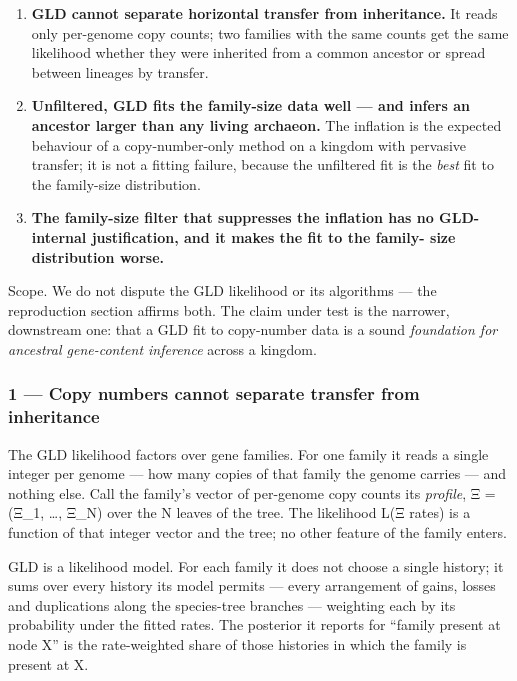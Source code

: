 \documentclass[
  10pt,
]{article}
\providecommand{\tightlist}{%
  \setlength{\itemsep}{0pt}\setlength{\parskip}{0pt}}
\begin{document}
\begin{enumerate}
\def\labelenumi{\arabic{enumi}.}
\tightlist
\item
  \textbf{GLD cannot separate horizontal transfer from inheritance.} It
  reads only per-genome copy counts; two families with the same counts
  get the same likelihood whether they were inherited from a common
  ancestor or spread between lineages by transfer.
\item
  \textbf{Unfiltered, GLD fits the family-size data well --- and infers
  an ancestor larger than any living archaeon.} The inflation is the
  expected behaviour of a copy-number-only method on a kingdom with
  pervasive transfer; it is not a fitting failure, because the
  unfiltered fit is the \emph{best} fit to the family-size distribution.
\item
  \textbf{The family-size filter that suppresses the inflation has no
  GLD-internal justification, and it makes the fit to the family- size
  distribution worse.}
\end{enumerate}

Scope. We do not dispute the GLD likelihood or its algorithms --- the
reproduction section affirms both. The claim under test is the narrower,
downstream one: that a GLD fit to copy-number data is a sound
\emph{foundation for ancestral gene-content inference} across a kingdom.

\subsubsection{1 --- Copy numbers cannot separate transfer from
inheritance}\label{1--copy-numbers-cannot-separate-transfer-from-inheritance}

The GLD likelihood factors over gene families. For one family it reads a
single integer per genome --- how many copies of that family the genome
carries --- and nothing else. Call the family's vector of per-genome
copy counts its \emph{profile}, Ξ = (Ξ\_1, \ldots, Ξ\_N) over the N
leaves of the tree. The likelihood L(Ξ \textbar{} rates) is a function
of that integer vector and the tree; no other feature of the family
enters.

GLD is a likelihood model. For each family it does not choose a single
history; it sums over every history its model permits --- every
arrangement of gains, losses and duplications along the species-tree
branches --- weighting each by its probability under the fitted rates.
The posterior it reports for ``family present at node X'' is the
rate-weighted share of those histories in which the family is present at
X.
\end{document}
